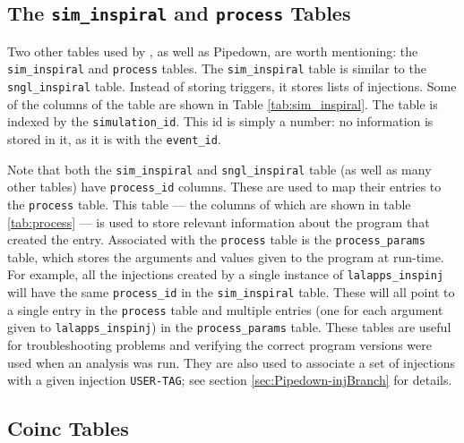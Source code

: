 \subsection{The \texttt{sim\_inspiral} and \texttt{process} Tables}
\label{sec:sim_inspiral-process_tables}

Two other tables used by \hipe, as well as Pipedown, are worth mentioning: the
\texttt{sim\_inspiral} and \texttt{process} tables. The \texttt{sim\_inspiral}
table is similar to the \texttt{sngl\_inspiral} table. Instead of storing
triggers, it stores lists of injections. Some of the columns of the table are
shown in Table \ref{tab:sim_inspiral}. The table is indexed by the
\texttt{simulation\_id}. This id is simply a number: no information is stored
in it, as it is with the \texttt{event\_id}.

Note that both the \texttt{sim\_inspiral} and \texttt{sngl\_inspiral} table (as
well as many other tables) have \texttt{process\_id} columns. These are used to
map their entries to the \texttt{process} table. This table --- the columns of
which are shown in table \ref{tab:process} --- is used to store relevant
information about the program that created the entry. Associated with the
\texttt{process} table is the \texttt{process\_params} table, which stores the
arguments and values given to the program at run-time. For example, all the
injections created by a single instance of \texttt{lalapps\_inspinj} will have
the same \texttt{process\_id} in the \texttt{sim\_inspiral} table. These will
all point to a single entry in the \texttt{process} table and multiple entries
(one for each argument given to \texttt{lalapps\_inspinj}) in the
\texttt{process\_params} table. These tables are useful for troubleshooting
problems and verifying the correct program versions were used when an analysis
was run. They are also used to associate a set of injections with a given
injection \texttt{USER-TAG}; see section \ref{sec:Pipedown-injBranch} for details.

\subsection{Coinc Tables}
\label{sec:coinc_tables}

